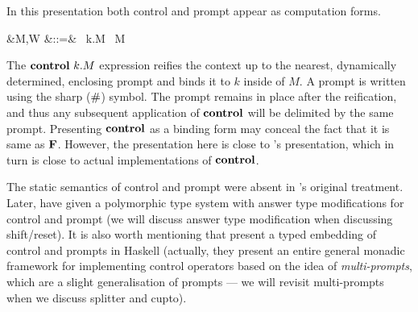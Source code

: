 \documentclass[12pt,phd,lfcs,twoside,openright,logo,leftchapter,normalheadings]{infthesis}
\theoremstyle{plain}
\theoremstyle{definition}
\begin{document}
In this presentation both control and prompt appear as computation
forms.
%
\begin{syntax}
     &M,W \in \CompCat &::=& \cdots \mid \Control~k.M \mid \Prompt~M
\end{syntax}
%
The $\mathbf{control}~k.M$ expression reifies the context up to the nearest,
dynamically determined, enclosing prompt and binds it to $k$ inside of
$M$. A prompt is written using the sharp ($\#$) symbol.
%
The prompt remains in place after the reification, and thus any
subsequent application of $\mathbf{control}$ will be delimited by the same
prompt.
%
Presenting $\mathbf{control}$ as a binding form may conceal the fact that it
is same as $\mathbf{F}$. However, the presentation here is close to
\citeauthor{SitaramF90}'s presentation, which in turn is close to
actual implementations of $\mathbf{control}$.

The static semantics of control and prompt were absent in
\citeauthor{Felleisen88}'s original treatment. Later,
\citet{KameyamaY08} have given a polymorphic type system with answer
type modifications for control and prompt (we will discuss answer type
modification when discussing shift/reset). It is also worth mentioning
that \citet{DybvigJS07} present a typed embedding of control and
prompts in Haskell (actually, they present an entire general monadic
framework for implementing control operators based on the idea of
\emph{multi-prompts}, which are a slight generalisation of prompts ---
we will revisit multi-prompts when we discuss splitter and cupto).
%


\end{document}
